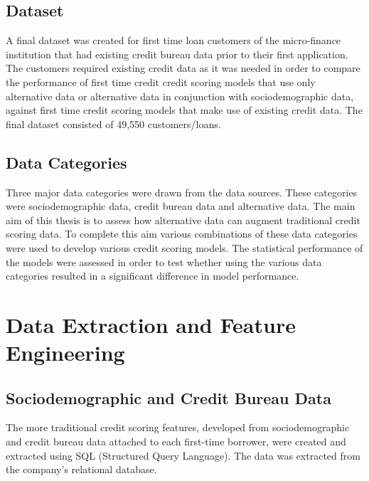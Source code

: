 \subsection{Dataset}

A final dataset was created for first time loan customers of the micro-finance institution that had existing credit bureau data prior to their first application. The customers required existing credit data as it was needed in order to compare the performance of first time credit credit scoring models that use only alternative data or alternative data in conjunction with sociodemographic data, against first time credit scoring models that make use of existing credit data. The final dataset consisted of 49,550 customers/loans. 

\subsection{Data Categories}

Three major data categories were drawn from the data sources. These categories were sociodemographic data, credit bureau data and alternative data. The main aim of this thesis is to assess how alternative data can augment traditional credit scoring data. To complete this aim various combinations of these data categories were used to develop various credit scoring models. The statistical performance of the models were assessed in order to test whether using the various data categories resulted in a significant difference in model performance. 


\section{Data Extraction and Feature Engineering}

\subsection{Sociodemographic and Credit Bureau Data}

The more traditional credit scoring features, developed from sociodemographic and credit bureau data attached to each first-time borrower, were created and extracted using SQL (Structured Query Language). The data was extracted from the company's relational database. \\

